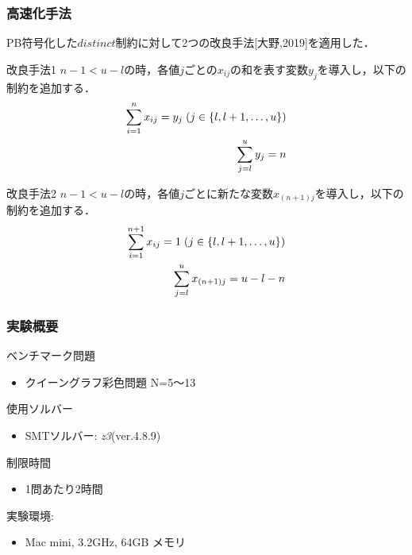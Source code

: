 \documentclass [dvipdfmx,12pt]{beamer}
\newcommand{\distinct}{$distinct$}
\begin{document}

\begin{frame}\footnotesize
    \frametitle{高速化手法}
    PB符号化した\distinct 制約に対して2つの改良手法[大野,2019]を適用した．
    \begin{exampleblock}{改良手法1}
        $n-1 < u-l$の時，各値$j$ごとの$x_{ij}$の和を表す変数$y_{j}$を導入し，以下の制約を追加する．
    \vspace{-3mm}
        \begin{eqnarray}
            \sum_{i=1}^{n} x_{ij}=y_j \; (j \in \{l,l+1, \ldots,u\})\\
    \vspace{-3mm}
            \sum_{j=l}^{u} y_j = n
        \end{eqnarray}
    \end{exampleblock}
    \vspace{-3mm}
    \begin{exampleblock}{改良手法2}
        $n-1 < u-l$の時，各値$j$ごとに新たな変数$x_{(n+1)j}$を導入し，以下の制約を追加する．
    \vspace{-3mm}
        \begin{eqnarray}
            \sum_{i=1}^{n+1} x_{ij}=1 \; (j \in \{l,l+1, \ldots,u\})\\
    \vspace{-3mm}
            \sum_{j=l}^{u} x_{(n+1)j} = u-l-n
        \end{eqnarray}
    \end{exampleblock}
\end{frame}


\begin{frame}
    \frametitle{実験概要}
    ベンチマーク問題
    \begin{itemize}
        \item クイーングラフ彩色問題 N=5〜13
    \end{itemize}
    使用ソルバー
    \begin{itemize}
        \item SMTソルバー: \textit{z3}(ver.4.8.9)
    \end{itemize}
    制限時間
    \begin{itemize}
        \item 1問あたり2時間
    \end{itemize}
    実験環境:
    \begin{itemize}
        \item Mac mini,  3.2GHz,  64GB メモリ
    \end{itemize}
\end{frame}
\end{document}
